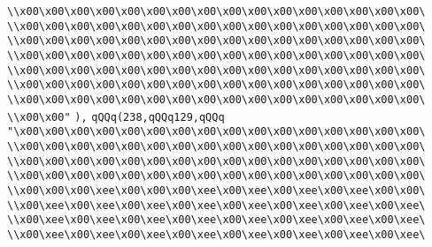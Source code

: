 \verb|\\x00\x00\x00\x00\x00\x00\x00\x00\x00\x00\x00\x00\x00\x00\x00\x00\|\newline
\verb|\\x00\x00\x00\x00\x00\x00\x00\x00\x00\x00\x00\x00\x00\x00\x00\x00\|\newline
\verb|\\x00\x00\x00\x00\x00\x00\x00\x00\x00\x00\x00\x00\x00\x00\x00\x00\|\newline
\verb|\\x00\x00\x00\x00\x00\x00\x00\x00\x00\x00\x00\x00\x00\x00\x00\x00\|\newline
\verb|\\x00\x00\x00\x00\x00\x00\x00\x00\x00\x00\x00\x00\x00\x00\x00\x00\|\newline
\verb|\\x00\x00\x00\x00\x00\x00\x00\x00\x00\x00\x00\x00\x00\x00\x00\x00\|\newline
\verb|\\x00\x00\x00\x00\x00\x00\x00\x00\x00\x00\x00\x00\x00\x00\x00\x00\|\newline
\verb|\\x00\x00"|\newline
\verb|),|\newline
\verb|qQQq(238,qQQq129,qQQq|\newline
\verb|"\x00\x00\x00\x00\x00\x00\x00\x00\x00\x00\x00\x00\x00\x00\x00\x00\|\newline
\verb|\\x00\x00\x00\x00\x00\x00\x00\x00\x00\x00\x00\x00\x00\x00\x00\x00\|\newline
\verb|\\x00\x00\x00\x00\x00\x00\x00\x00\x00\x00\x00\x00\x00\x00\x00\x00\|\newline
\verb|\\x00\x00\x00\x00\x00\x00\x00\x00\x00\x00\x00\x00\x00\x00\x00\x00\|\newline
\verb|\\x00\x00\x00\xee\x00\x00\x00\xee\x00\xee\x00\xee\x00\xee\x00\x00\|\newline
\verb|\\x00\xee\x00\xee\x00\xee\x00\xee\x00\xee\x00\xee\x00\xee\x00\xee\|\newline
\verb|\\x00\xee\x00\xee\x00\xee\x00\xee\x00\xee\x00\xee\x00\xee\x00\xee\|\newline
\verb|\\x00\xee\x00\xee\x00\xee\x00\xee\x00\xee\x00\xee\x00\xee\x00\xee\|\newline

